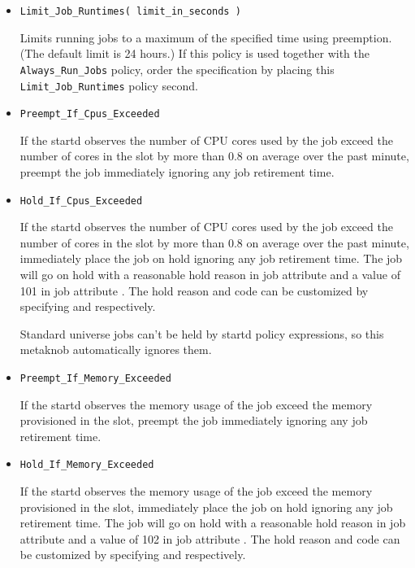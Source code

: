\begin{description}
\begin{itemize}
    \item \texttt{Limit\_Job\_Runtimes( limit\_in\_seconds )}

    Limits running jobs to a maximum of the specified time using preemption.
	(The default limit is 24 hours.)
    If this policy is used together with the \texttt{Always\_Run\_Jobs} policy,
    order the specification by placing this \texttt{Limit\_Job\_Runtimes} 
    policy second. 

	\item \texttt{Preempt\_If\_Cpus\_Exceeded}

	If the startd observes the number of CPU cores used by the job exceed
	the number of cores in the slot by more than 0.8 on average over the past
	minute, preempt the job immediately
	ignoring any job retirement time.

	\item \texttt{Hold\_If\_Cpus\_Exceeded}

	If the startd observes the number of CPU cores used by the job exceed
	the number of cores in the slot by more than 0.8 on average over the past
	minute, immediately place the job on hold
	ignoring any job retirement time.  The job will go on hold with a reasonable
	hold reason in job attribute  and a value of 101 in job
	attribute .  The hold reason and code can be customized by
	specifying  and
	 respectively.

	Standard universe jobs can't be held by startd policy expressions,
	so this metaknob automatically ignores them.

	\item \texttt{Preempt\_If\_Memory\_Exceeded}

	If the startd observes the memory usage of the job exceed
	the memory provisioned in the slot, preempt the job immediately
	ignoring any job retirement time.

	\item \texttt{Hold\_If\_Memory\_Exceeded}

	If the startd observes the memory usage of the job exceed
	the memory provisioned in the slot,
	immediately place the job on hold
	ignoring any job retirement time.
	The job will go on hold with a reasonable
	hold reason in job attribute  and a value of 102 in job
	attribute .  The hold reason and code can be customized by
	specifying  and
	 respectively.


\end{itemize}
\end{description}
